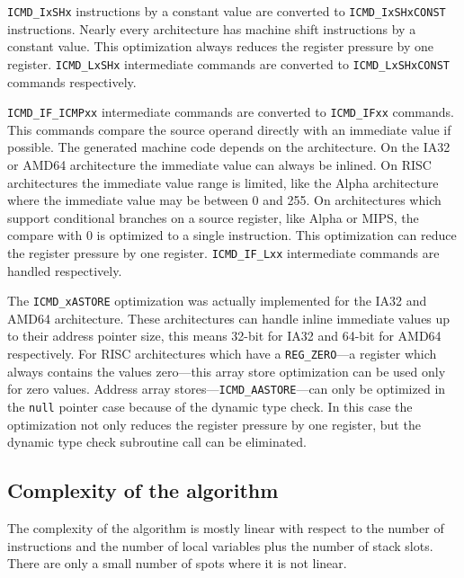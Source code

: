 \texttt{ICMD\_IxSHx} instructions by a constant value are converted
to \texttt{ICMD\_IxSHxCONST} instructions. Nearly every architecture
has machine shift instructions by a constant value. This optimization
always reduces the register pressure by one
register. \texttt{ICMD\_LxSHx} intermediate commands are converted to
\texttt{ICMD\_LxSHxCONST} commands respectively.

\texttt{ICMD\_IF\_ICMPxx} intermediate commands are converted to
\texttt{ICMD\_IFxx} commands. This commands compare the source
operand directly with an immediate value if possible. The generated
machine code depends on the architecture. On the IA32 or AMD64
architecture the immediate value can always be inlined. On RISC
architectures the immediate value range is limited, like the Alpha
architecture where the immediate value may be between 0 and 255. On
architectures which support conditional branches on a source register,
like Alpha or MIPS, the compare with 0 is optimized to a single
instruction. This optimization can reduce the register pressure by one
register. \texttt{ICMD\_IF\_Lxx} intermediate commands are handled
respectively.

The \texttt{ICMD\_xASTORE} optimization was actually implemented for
the IA32 and AMD64 architecture. These architectures can handle inline
immediate values up to their address pointer size, this means 32-bit
for IA32 and 64-bit for AMD64 respectively. For RISC architectures
which have a \texttt{REG\_ZERO}---a register which always contains the
values zero---this array store optimization can be used only for zero
values. Address array stores---\texttt{ICMD\_AASTORE}---can only be
optimized in the \texttt{null} pointer case because of the dynamic
type check. In this case the optimization not only reduces the
register pressure by one register, but the dynamic type check
subroutine call can be eliminated.


\subsection{Complexity of the algorithm}

The complexity of the algorithm is mostly linear with respect to the number
of instructions and the number of local variables plus the number of stack
slots. There are only a small number of spots where it is not linear. 

